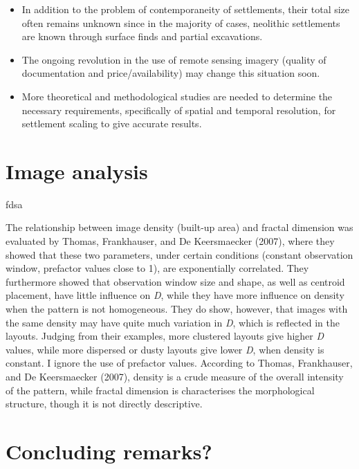 \documentclass[
  12pt,
  a4paper, twoside]{book}
\begin{document}
\begin{itemize}
  \begin{itemize}
  \item
    In addition to the problem of contemporaneity of settlements, their total size often remains unknown since in the majority of cases, neolithic settlements are known through surface finds and partial excavations.
  \item
    The ongoing revolution in the use of remote sensing imagery (quality of documentation and price/availability) may change this situation soon.
  \item
    More theoretical and methodological studies are needed to determine the necessary requirements, specifically of spatial and temporal resolution, for settlement scaling to give accurate results.
  \end{itemize}
\end{itemize}

\hypertarget{image-analysis}{%
\section{Image analysis}\label{image-analysis}}

fdsa

The relationship between image density (built-up area) and fractal dimension was evaluated by Thomas, Frankhauser, and De Keersmaecker (2007), where they showed that these two parameters, under certain conditions (constant observation window, prefactor values close to 1), are exponentially correlated. They furthermore showed that observation window size and shape, as well as centroid placement, have little influence on \emph{D}, while they have more influence on density when the pattern is not homogeneous. They do show, however, that images with the same density may have quite much variation in \emph{D}, which is reflected in the layouts. Judging from their examples, more clustered layouts give higher \emph{D} values, while more dispersed or dusty layouts give lower \emph{D}, when density is constant. I ignore the use of prefactor values. According to Thomas, Frankhauser, and De Keersmaecker (2007), density is a crude measure of the overall intensity of the pattern, while fractal dimension is characterises the morphological structure, though it is not directly descriptive.

\hypertarget{concluding-remarks}{%
\section{Concluding remarks?}\label{concluding-remarks}}
\end{document}
